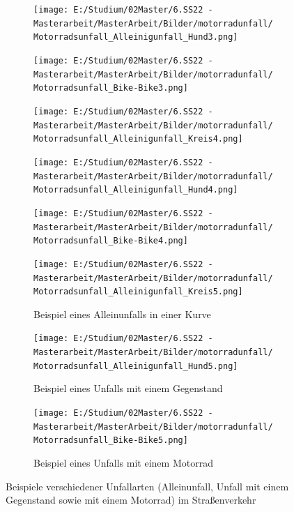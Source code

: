 \begin{figure}[htpb]
\begin{subfigure}{0.28\textwidth}
		\centering
		\texttt{[image: E:/Studium/02Master/6.SS22 - Masterarbeit/MasterArbeit/Bilder/motorradunfall/Motorradsunfall\_Alleinigunfall\_Hund3.png]}
	\end{subfigure}
	\begin{subfigure}{0.28\textwidth}
		\centering
		\texttt{[image: E:/Studium/02Master/6.SS22 - Masterarbeit/MasterArbeit/Bilder/motorradunfall/Motorradsunfall\_Bike-Bike3.png]}
	\end{subfigure}
	\begin{subfigure}{0.28\textwidth}
		\centering
		\texttt{[image: E:/Studium/02Master/6.SS22 - Masterarbeit/MasterArbeit/Bilder/motorradunfall/Motorradsunfall\_Alleinigunfall\_Kreis4.png]}
	\end{subfigure}
	\begin{subfigure}{0.28\textwidth}
		\centering
		\texttt{[image: E:/Studium/02Master/6.SS22 - Masterarbeit/MasterArbeit/Bilder/motorradunfall/Motorradsunfall\_Alleinigunfall\_Hund4.png]}
	\end{subfigure}
	\begin{subfigure}{0.28\textwidth}
		\centering
		\texttt{[image: E:/Studium/02Master/6.SS22 - Masterarbeit/MasterArbeit/Bilder/motorradunfall/Motorradsunfall\_Bike-Bike4.png]}
	\end{subfigure}
	\begin{subfigure}{0.28\textwidth}
		\centering
		\texttt{[image: E:/Studium/02Master/6.SS22 - Masterarbeit/MasterArbeit/Bilder/motorradunfall/Motorradsunfall\_Alleinigunfall\_Kreis5.png]}
		\caption{Beispiel eines Alleinunfalls in einer Kurve}
		\label{fig:Motorradsunfall_Alleinigunfall_Kreis}
	\end{subfigure}
	\begin{subfigure}{0.28\textwidth}
		\centering
		\texttt{[image: E:/Studium/02Master/6.SS22 - Masterarbeit/MasterArbeit/Bilder/motorradunfall/Motorradsunfall\_Alleinigunfall\_Hund5.png]}
		\caption{Beispiel eines Unfalls mit einem Gegenstand}
		\label{fig:Motorradsunfall_Alleinigunfall_Hund}
	\end{subfigure}
	\begin{subfigure}{0.28\textwidth}
		\centering
		\texttt{[image: E:/Studium/02Master/6.SS22 - Masterarbeit/MasterArbeit/Bilder/motorradunfall/Motorradsunfall\_Bike-Bike5.png]}
		\caption{Beispiel eines Unfalls mit einem Motorrad}
		\label{fig:Motorradsunfall_Bike-Bike}
	\end{subfigure}
	\caption{Beispiele verschiedener Unfallarten (Alleinunfall, Unfall mit einem Gegenstand sowie mit einem Motorrad) im Straßenverkehr}
	\label{fig:MotorradsunfallBeipsiele}
\end{figure}

